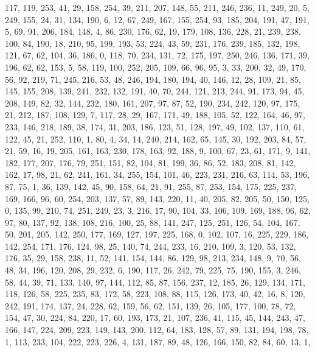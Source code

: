 \begin{DoxyCode}
       117, 119, 253, 41, 29, 158, 254, 39, 211, 207, 148, 55, 211, 246, 236, 11, 249, 20, 5, 249, 155, 24, 31,
       134, 190, 6, 12, 67, 249, 167, 155, 254, 93, 185, 204, 191, 47, 191, 5, 69, 91, 206, 184, 148, 4, 86, 230, 176,
       62, 19, 179, 108, 136, 228, 21, 239, 238, 100, 84, 190, 18, 210, 95, 199, 193, 53, 224, 43, 59, 231, 176,
       239, 185, 132, 198, 121, 67, 62, 104, 36, 186, 0, 118, 70, 234, 131, 72, 175, 197, 250, 246, 136, 171, 39,
       196, 62, 62, 153, 5, 58, 119, 100, 252, 205, 109, 66, 96, 95, 3, 33, 200, 32, 49, 170, 56, 92, 219, 71, 245,
       216, 53, 48, 246, 194, 180, 194, 40, 146, 12, 28, 109, 21, 85, 145, 155, 208, 139, 241, 232, 132, 191, 40,
       70, 244, 121, 213, 244, 91, 173, 94, 45, 208, 149, 82, 32, 144, 232, 180, 161, 207, 97, 87, 52, 190, 234, 242,
       120, 97, 175, 21, 212, 187, 108, 129, 7, 117, 28, 29, 167, 171, 49, 188, 105, 52, 122, 164, 46, 97, 233,
       146, 218, 189, 38, 174, 31, 203, 186, 123, 51, 128, 197, 49, 102, 137, 110, 61, 122, 45, 21, 252, 110, 1, 80,
       4, 34, 14, 240, 214, 162, 65, 145, 30, 192, 203, 84, 57, 21, 59, 16, 19, 205, 161, 163, 230, 178, 163, 92,
       188, 9, 100, 67, 23, 61, 171, 9, 141, 182, 177, 207, 176, 79, 251, 151, 82, 104, 81, 199, 36, 86, 52, 183,
       208, 81, 142, 162, 17, 98, 21, 62, 241, 161, 34, 255, 154, 101, 46, 223, 231, 216, 63, 114, 53, 196, 87, 75,
       1, 36, 139, 142, 45, 90, 158, 64, 21, 91, 255, 87, 253, 154, 175, 225, 237, 169, 166, 96, 60, 254, 203, 137,
       57, 89, 143, 220, 11, 40, 205, 82, 205, 50, 150, 125, 0, 135, 99, 210, 74, 251, 249, 23, 3, 216, 17, 90,
       104, 33, 106, 109, 169, 188, 96, 62, 97, 80, 137, 92, 138, 108, 216, 100, 25, 88, 141, 247, 125, 251, 126, 54,
       104, 167, 50, 201, 205, 142, 250, 177, 169, 127, 197, 225, 168, 0, 102, 107, 16, 225, 229, 186, 142, 254,
       171, 176, 124, 98, 25, 140, 74, 244, 233, 16, 210, 109, 3, 120, 53, 132, 176, 35, 29, 158, 238, 11, 52, 141,
       154, 144, 86, 129, 98, 213, 234, 148, 9, 70, 56, 48, 34, 196, 120, 208, 29, 232, 6, 190, 117, 26, 242, 79,
       225, 75, 190, 155, 3, 246, 58, 44, 39, 71, 133, 140, 97, 144, 112, 85, 87, 156, 237, 12, 185, 26, 129, 134,
       171, 118, 126, 58, 225, 235, 83, 172, 58, 223, 108, 88, 115, 126, 173, 40, 42, 16, 8, 120, 242, 191, 174, 137,
       24, 228, 62, 159, 56, 62, 151, 139, 26, 105, 177, 100, 78, 72, 154, 47, 30, 224, 84, 220, 17, 60, 193, 173,
       21, 107, 236, 41, 115, 45, 144, 243, 47, 166, 147, 224, 209, 223, 149, 143, 200, 112, 64, 183, 128, 57, 89,
       131, 194, 198, 78, 1, 113, 233, 104, 222, 223, 226, 4, 131, 187, 89, 48, 126, 166, 150, 82, 84, 60, 13, 1,

\end{DoxyCode}
